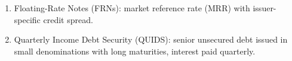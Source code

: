 \begin{remark} 
\begin{enumerate}[label=\roman*.]
\setlength{\itemsep}{0pt}
\item Floating-Rate Notes (FRNs): market reference rate (MRR) with issuer-specific credit spread.
\item Quarterly Income Debt Security (QUIDS): senior unsecured debt issued in small denominations with long maturities, interest paid quarterly.
\end{enumerate}
\end{remark}
